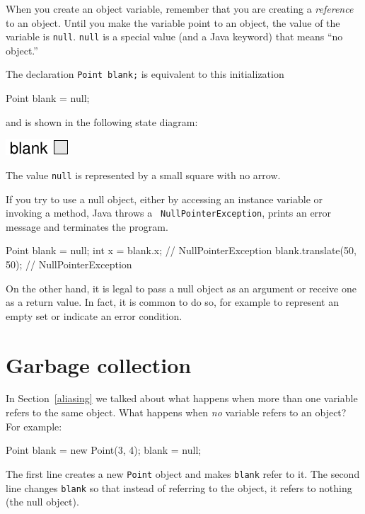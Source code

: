 When you create an object variable, remember that you are
creating a {\em reference} to an object.  Until you make
the variable point to an object, the value of the variable
is {\tt null}.  {\tt null} is a special value (and
a Java keyword) that means ``no object.''

The declaration {\tt Point blank;} is equivalent to this
initialization

\begin{code}
    Point blank = null;
\end{code}

and is shown in the following state diagram:


\includegraphics{figs/reference2.pdf}


The value {\tt null} is represented by a small square with no arrow.


If you try to use a null object, either by accessing an instance
variable or invoking a method, Java throws a {\tt
NullPointerException}, prints an error message
and terminates the program.

\begin{code}
    Point blank = null;
    int x = blank.x;              // NullPointerException
    blank.translate(50, 50);      // NullPointerException
\end{code}

On the other hand, it is legal to pass a null object as an argument or
receive one as a return value.  In fact, it is common to do so, for
example to represent an empty set or indicate an error condition.


\section{Garbage collection}

In Section~\ref{aliasing} we talked about what happens when
more than one variable refers to the same object.  What happens
when {\em no} variable refers to an object?  For example:

\begin{code}
    Point blank = new Point(3, 4);
    blank = null;
\end{code}

The first line creates a new {\tt Point} object and makes
{\tt blank} refer to it.  The second line changes {\tt blank}
so that instead of referring to the object, it refers to
nothing (the null object).


